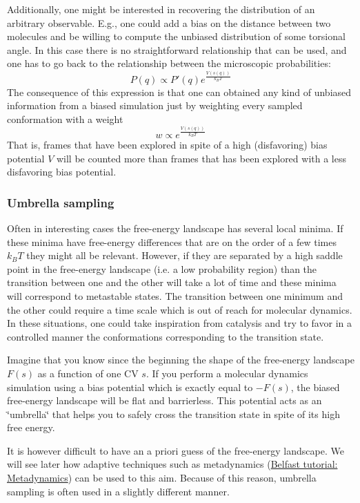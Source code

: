 Additionally, one might be interested in recovering the distribution of an arbitrary observable. E.\+g., one could add a bias on the distance between two molecules and be willing to compute the unbiased distribution of some torsional angle. In this case there is no straightforward relationship that can be used, and one has to go back to the relationship between the microscopic probabilities\+: \[ P(q)\propto P'(q) e^{\frac{V(s(q))}{k_BT}} \] The consequence of this expression is that one can obtained any kind of unbiased information from a biased simulation just by weighting every sampled conformation with a weight \[ w\propto e^{\frac{V(s(q))}{k_BT}} \] That is, frames that have been explored in spite of a high (disfavoring) bias potential $ V $ will be counted more than frames that has been explored with a less disfavoring bias potential.\hypertarget{belfast-4_belfast-4-theory-us}{}\subsubsection{Umbrella sampling}\label{belfast-4_belfast-4-theory-us}
Often in interesting cases the free-\/energy landscape has several local minima. If these minima have free-\/energy differences that are on the order of a few times $k_BT$ they might all be relevant. However, if they are separated by a high saddle point in the free-\/energy landscape (i.\+e. a low probability region) than the transition between one and the other will take a lot of time and these minima will correspond to metastable states. The transition between one minimum and the other could require a time scale which is out of reach for molecular dynamics. In these situations, one could take inspiration from catalysis and try to favor in a controlled manner the conformations corresponding to the transition state.

Imagine that you know since the beginning the shape of the free-\/energy landscape $ F(s) $ as a function of one C\+V $ s $. If you perform a molecular dynamics simulation using a bias potential which is exactly equal to $ -F(s) $, the biased free-\/energy landscape will be flat and barrierless. This potential acts as an \char`\"{}umbrella\char`\"{} that helps you to safely cross the transition state in spite of its high free energy.

It is however difficult to have an a priori guess of the free-\/energy landscape. We will see later how adaptive techniques such as metadynamics (\hyperlink{belfast-6}{Belfast tutorial\+: Metadynamics}) can be used to this aim. Because of this reason, umbrella sampling is often used in a slightly different manner.

